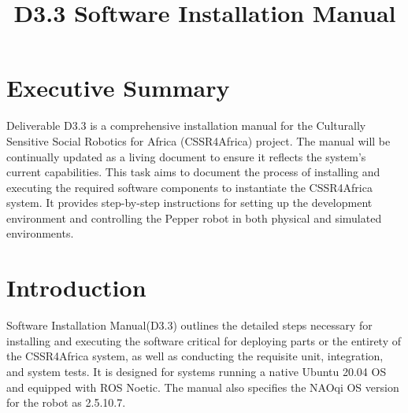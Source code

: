 \documentclass{CSSRforAfrica}
\newcommand{\blank}{~\\}
\begin{document}



\title{D3.3 Software Installation Manual}    

\partner{}                                      



\maketitle

\section*{Executive Summary}
Deliverable D3.3 is a comprehensive installation manual for the Culturally Sensitive Social Robotics for Africa (CSSR4Africa) project. The manual will be continually updated as a living document to ensure it reflects the system's current capabilities. This task aims to document the process of installing and executing the required software components to instantiate the CSSR4Africa system. It provides step-by-step instructions for setting up the development environment and controlling the Pepper robot in both physical and simulated environments.
\label{executive_summary}

\pagebreak
\tableofcontents
\pagebreak


\pagebreak


\section{Introduction}
Software Installation Manual(D3.3) outlines the detailed steps necessary for installing and executing the software critical for deploying parts or the entirety of the CSSR4Africa system, as well as conducting the requisite unit, integration, and system tests. It is designed for systems running a native Ubuntu 20.04 OS and equipped with ROS Noetic. The manual also specifies the NAOqi OS version for the robot as 2.5.10.7.
\end{document}
